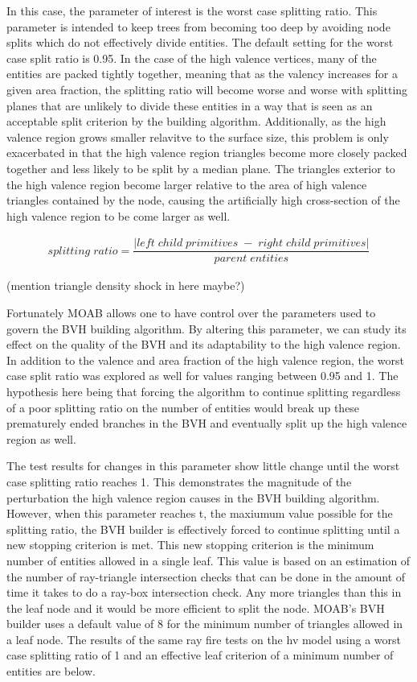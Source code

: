\documentclass[12pt, a4paper]{article}
\begin{document}
In this case, the parameter of interest is the worst case splitting ratio. This parameter is intended to keep trees from becoming too deep by avoiding node splits which do not effectively divide entities. The default setting for the worst case split ratio is 0.95. In the case of the high valence vertices, many of the entities are packed tightly together, meaning that as the valency increases for a given area fraction, the splitting ratio will become worse and worse with splitting planes that are unlikely to divide these entities in a way that is seen as an acceptable split criterion by the building algorithm. Additionally, as the high valence region grows smaller relavitve to the surface size, this problem is only exacerbated in that the high valence region triangles become more closely packed together and less likely to be split by a median plane. The triangles exterior to the high valence region become larger relative to the area of high valence triangles contained by the node, causing the artificially high cross-section of the high valence region to be come larger as well.


  \begin{align*}
  splitting\;ratio  = \dfrac{|left\; child\; primitives\; -\; right\; child\; primitives|}{parent\; entities}
  \end{align*}

(mention triangle density shock in here maybe?)

  Fortunately MOAB allows one to have control over the parameters used to govern the BVH building algorithm. By altering this parameter, we can study its effect on the quality of the BVH and its adaptability to the high valence region. In addition to the valence and area fraction of the high valence region, the worst case split ratio was explored as well for values ranging between 0.95 and 1. The hypothesis here being that forcing the algorithm to continue splitting regardless of a poor splitting ratio on the number of entities would break up these prematurely ended branches in the BVH and eventually split up the high valence region as well.


  The test results for changes in this parameter show little change until the worst case splitting ratio reaches 1. This demonstrates the magnitude of the  perturbation the high valence region causes in the BVH building algorithm. However, when this parameter reaches t, the maxiumum value possible for the splitting ratio, the BVH builder is effectively forced to continue splitting until a new stopping criterion is met. This new stopping criterion is the minimum number of entities allowed in a single leaf. This value is based on an estimation of the number of ray-triangle intersection checks that can be done in the amount of time it takes to do a ray-box intersection check. Any more triangles than this in the leaf node and it would be more efficient to split the node. MOAB's BVH builder uses a default value of 8 for the minimum number of triangles allowed in a leaf node. The results of the same ray fire tests on the hv model using a worst case splitting ratio of 1 and an effective leaf criterion of a minimum number of entities are below.
\end{document}
